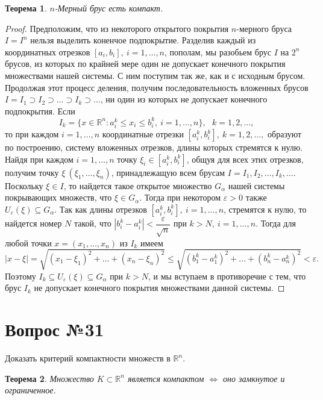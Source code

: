 \documentclass[12pt]{report}
\numberwithin{equation}{section}
\newtheorem{theorem}{Теорема}[section]
\begin{document}
\begin{theorem} \label{th:30:1}
$n$-Мерный брус есть компакт.
\end{theorem}
\begin{proof}
Предположим, что из некоторого открытого покрытия $n$-мерного бруса $I = I^n$ нельзя выделить коненчое подпокрытие. Разделив каждый из координатных отрезков $[a_i, b_i],~i = 1, \ldots, n$, пополам, мы разобьем брус $I$ на $2^n$ брусов, из которых по крайней мере один не допускает конечного покрытия множествами нашей системы. С ним поступим так же, как и с исходным брусом. Продолжая этот процесс деления, получим последовательность вложенных брусов $I = I_1 \supset I_2 \supset \ldots \supset I_k \supset \ldots$, ни один из которых не допускает конечного подпокрытия. Если
\[ I_k = \{ x \in \mathbb{R}^n : a_i^k \leqslant x_i \leqslant b_i^k, ~i = 1, \ldots, n\},~~~k = 1, 2 , \ldots, \]
то при каждом $i = 1, \ldots, n$ координатные отрезки $[a_i^k, b_i^k],~k = 1,2,\ldots,$ образуют по построению, систему вложенных отрезков, длины которых стремятся к нулю. Найдя при каждом $i = 1, \ldots, n$ точку $\xi_i \in [a_i^k, b_i^k]$, общуя для всех этих отрезков, получим точку $\xi \ (\xi_1, \ldots, \xi_n)$, принадлежащую всем брусам $I = I_1, I_2, \ldots, I_k, \ldots$. Поскольку $\xi \in I$, то найдется такое открытое множество $G_{\alpha}$ нашей системы покрывающих множеств, что $\xi \in G_{\alpha}$. Тогда при некотором $\varepsilon > 0$ также $U_{\varepsilon}(\xi) \subseteq G_{\alpha}$. Так как длины отрезков $[a_i^k, b_i^k],~i = 1, \ldots, n$, стремятся к нулю, то найдется номер $N$ такой, что $|b_i^k - a_i^k| < \dfrac{\varepsilon}{\sqrt{n}}$ при $k > N,~i = 1, \ldots, n$. Тогда для любой точки $x = (x_1, \ldots, x_n)$ из $I_k$ имеем
\[ |x - \xi| = \sqrt{(x_1 - \xi_1)^2 + \dots + (x_n - \xi_n)^2} \leqslant \sqrt{(b_1^k - a_1^k)^2 + \dots + (b_n^k - a_n^k)^2} < \varepsilon. \]
Поэтому $I_k \subseteq U_{\varepsilon}(\xi) \subseteq G_{\alpha}$ при $k > N$, и мы вступаем в противоречие с тем, что брус $I_k$ не допускает конечного покрытия множествами данной системы.
\end{proof}

\newpage \section{Вопрос №31} %
\begin{framed}
Доказать критерий компактности множеств в $\mathbb{R}^n$.
\end{framed}
\begin{theorem} \label{th:31:1}
Множество $K \subset \mathbb{R}^n$ является компактом $\iff$ оно замкнутое и ограниченное.
\end{theorem}
\end{document}
